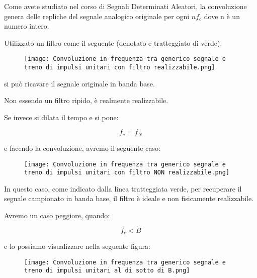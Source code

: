 \newpage 

Come avete studiato nel corso di Segnali Determinati Aleatori, 
la convoluzione genera delle repliche del segnale analogico originale per ogni $n f_c$ dove n è un numero intero. \newline 

Utilizzato un filtro come il seguente (denotato e tratteggiato di verde):

\begin{figure}[h]
    \centering
    \texttt{[image: Convoluzione in frequenza tra generico segnale e treno di impulsi unitari con filtro realizzabile.png]}
\end{figure} 

si può ricavare il segnale originale in banda base. \newline 

Non essendo un filtro ripido, è realmente realizzabile. \newline 

Se invece si dilata il tempo e si pone: 

{
    \Large 
    \begin{equation}
        f_c = f_N
    \end{equation}
}

e facendo la convoluzione, avremo il seguente caso: 


\begin{figure}[h]
    \centering
    \texttt{[image: Convoluzione in frequenza tra generico segnale e treno di impulsi unitari con filtro NON realizzabile.png]}
\end{figure} 

In questo caso, come indicato dalla linea tratteggiata verde, per recuperare il segnale campionato in banda base, 
il filtro è ideale e non fisicamente realizzabile. \newline 

Avremo un caso peggiore, quando: 

{
    \Large 
    \begin{equation}
        f_c < B
    \end{equation}
} 

e lo possiamo visualizzare nella seguente figura: 

\begin{figure}[h]
    \centering
    \texttt{[image: Convoluzione in frequenza tra generico segnale e treno di impulsi unitari al di sotto di B.png]}
\end{figure} 

